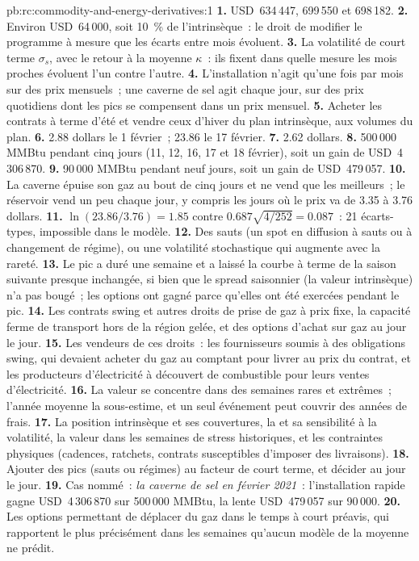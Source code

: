 \begin{solution}{pb:rc:commodity-and-energy-derivatives:1}
\textbf{1.} USD~634\,447, 699\,550 et 698\,182.
\textbf{2.} Environ USD~64\,000, soit 10~\% de l'intrinsèque~: le droit de modifier le programme à mesure que
les écarts entre mois évoluent.
\textbf{3.} La volatilité de court terme $\sigma_s$, avec le retour à la moyenne $\kappa$~: ils fixent dans quelle mesure
les mois proches évoluent l'un contre l'autre.
\textbf{4.} L'installation n'agit qu'une fois par mois sur des prix mensuels~; une caverne de sel agit chaque jour,
sur des prix quotidiens dont les pics se compensent dans un prix mensuel.
\textbf{5.} Acheter les contrats à terme d'été et vendre ceux d'hiver du plan intrinsèque, aux
volumes du plan.
\textbf{6.} 2.88 dollars le 1 février~; 23.86 le 17 février.
\textbf{7.} 2.62 dollars.
\textbf{8.} 500\,000 MMBtu pendant cinq jours (11, 12, 16, 17 et 18 février), soit un gain de
USD~4\,306\,870.
\textbf{9.} 90\,000 MMBtu pendant neuf jours, soit un gain de USD~479\,057.
\textbf{10.} La caverne épuise son gaz au bout de cinq jours et ne vend que les meilleurs~; le
réservoir vend un peu chaque jour, y compris les jours où le prix va de 3.35 à 3.76 dollars.
\textbf{11.} $\ln(23.86/3.76) = 1.85$ contre $0.687\sqrt{4/252} = 0.087$~: 21 écarts-types,
impossible dans le modèle.
\textbf{12.} Des sauts (un spot en diffusion à sauts ou à changement de régime), ou une volatilité stochastique
qui augmente avec la rareté.
\textbf{13.} Le pic a duré une semaine et a laissé la courbe à terme de la saison suivante presque
inchangée, si bien que le spread saisonnier (la valeur intrinsèque) n'a pas bougé~; les options ont gagné
parce qu'elles ont été exercées pendant le pic.
\textbf{14.} Les contrats swing et autres droits de prise de gaz à prix fixe, la capacité ferme de transport
hors de la région gelée, et des options d'achat sur gaz au jour le jour.
\textbf{15.} Les vendeurs de ces droits~: les fournisseurs soumis à des obligations swing, qui devaient acheter du gaz
au comptant pour livrer au prix du contrat, et les producteurs d'électricité à découvert de combustible pour leurs ventes d'électricité.
\textbf{16.} La valeur se concentre dans des semaines rares et extrêmes~; l'année moyenne la sous-estime, et un
seul événement peut couvrir des années de frais.
\textbf{17.} La position intrinsèque et ses couvertures, la  et sa sensibilité à
la volatilité, la valeur dans les semaines de stress historiques, et les contraintes physiques (cadences,
ratchets, contrats susceptibles d'imposer des livraisons).
\textbf{18.} Ajouter des pics (sauts ou régimes) au facteur de court terme, et décider au jour le jour.
\textbf{19.} Cas nommé~: \emph{la caverne de sel en février 2021}~: l'installation rapide gagne
USD~4\,306\,870 sur 500\,000 MMBtu, la lente USD~479\,057 sur 90\,000.
\textbf{20.} Les options permettant de déplacer du gaz dans le temps à court préavis, qui rapportent le plus
précisément dans les semaines qu'aucun modèle de la moyenne ne prédit.
\end{solution}

